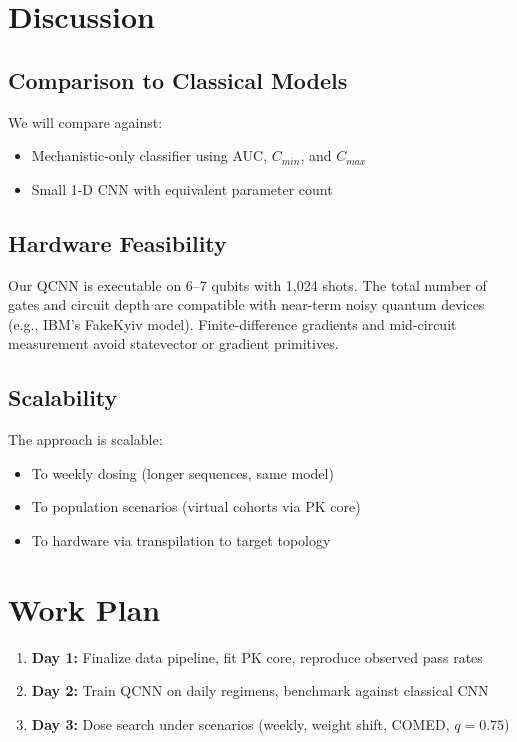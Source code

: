 \documentclass[11pt]{article}
\begin{document}
\begin{itemize}

\section{Discussion}
\subsection{Comparison to Classical Models}
We will compare against:
\begin{itemize}[noitemsep]
  \item Mechanistic-only classifier using AUC, $C_{min}$, and $C_{max}$
  \item Small 1-D CNN with equivalent parameter count
\end{itemize}

\subsection{Hardware Feasibility}
Our QCNN is executable on 6–7 qubits with 1,024 shots. The total number of gates and circuit depth are compatible with near-term noisy quantum devices (e.g., IBM's FakeKyiv model). Finite-difference gradients and mid-circuit measurement avoid statevector or gradient primitives.

\subsection{Scalability}
The approach is scalable:
\begin{itemize}[noitemsep]
  \item To weekly dosing (longer sequences, same model)
  \item To population scenarios (virtual cohorts via PK core)
  \item To hardware via transpilation to target topology
\end{itemize}

\section{Work Plan}
\begin{enumerate}[label=\textbf{\arabic*.}]
  \item \textbf{Day 1:} Finalize data pipeline, fit PK core, reproduce observed pass rates
  \item \textbf{Day 2:} Train QCNN on daily regimens, benchmark against classical CNN
  \item \textbf{Day 3:} Dose search under scenarios (weekly, weight shift, COMED, $q=0.75$)
\end{enumerate}


\end{itemize}
\end{document}
